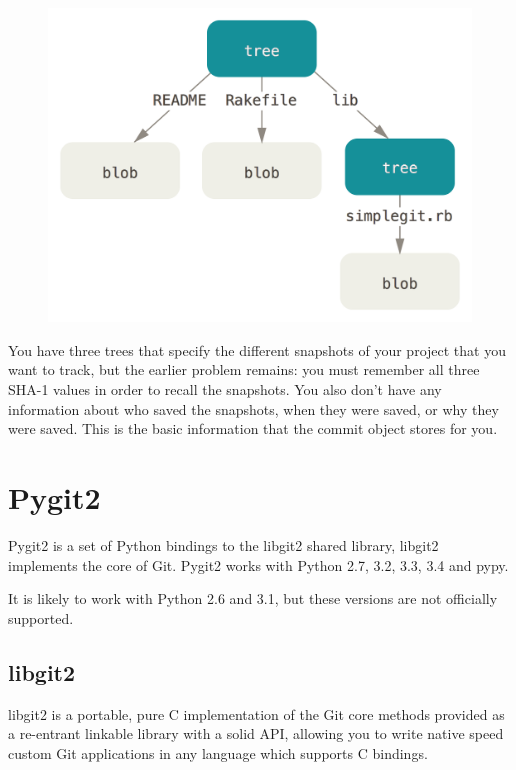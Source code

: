         \begin{figure}[h]
           \begin{center}
               \includegraphics[width=15cm]{technology/data-model-1.png}
            \end{center}
        \end{figure}
        
      You have three trees that specify the different snapshots of your project that you want to track, but the earlier problem remains: you must remember all three SHA-1 values in order to recall the snapshots. You also don’t have any information about who saved the snapshots, when they were saved, or why they were saved. This is the basic information that the commit object stores for you.
      
  
  \section{Pygit2}
    Pygit2 is a set of Python bindings to the libgit2 shared library, libgit2 implements the core of Git. Pygit2 works with Python 2.7, 3.2, 3.3, 3.4 and pypy.
      
    It is likely to work with Python 2.6 and 3.1, but these versions are not officially supported.
    \subsection{libgit2}
      libgit2 is a portable, pure C implementation of the Git core methods provided as a re-entrant linkable library with a solid API, allowing you to write native speed custom Git applications in any language which supports C bindings.
      
